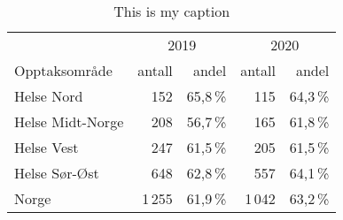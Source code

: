 \documentclass[12pt]{article}
\begin{document}
\begin{table}[h]
\begin{center}
\begin{tabular}{lrrrr}
\toprule
& \multicolumn{2}{c}{2019} &  \multicolumn{2}{c}{2020} \\
Opptaksområde & antall & andel & antall & andel \\
\midrule
Helse Nord       & 152 & 65,8\,\% & 115 & 64,3\,\%\\
Helse Midt-Norge & 208 & 56,7\,\% & 165 & 61,8\,\%\\
Helse Vest       & 247 & 61,5\,\% & 205 & 61,5\,\%\\
Helse Sør-Øst    & 648 & 62,8\,\% & 557 & 64,1\,\%\\
\midrule
Norge            &1\,255& 61,9\,\% &1\,042& 63,2\,\%\\
\bottomrule
\end{tabular}
\end{center}
\caption{This is my caption}
\end{table}
\end{document}
